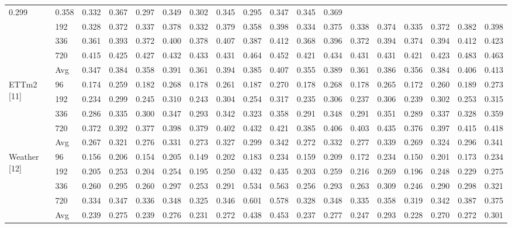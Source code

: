 \documentclass[
  10
]{article}
\begin{document}
{\begin{longtable}[]{@{}llllllllllllllllll@{}}
0.299 & 0.358 & 0.332 & 0.367 & 0.297 & 0.349 & 0.302 & 0.345 & 0.295 &
0.347 & 0.345 & 0.369 \\
& 192 & 0.328 & 0.372 & 0.337 & 0.378 & 0.332 & 0.379 & 0.358 & 0.398 &
0.334 & 0.375 & 0.338 & 0.374 & 0.335 & 0.372 & 0.382 & 0.398 \\
& 336 & 0.361 & 0.393 & 0.372 & 0.400 & 0.378 & 0.407 & 0.387 & 0.412 &
0.368 & 0.396 & 0.372 & 0.394 & 0.374 & 0.394 & 0.412 & 0.423 \\
& 720 & 0.415 & 0.425 & 0.427 & 0.432 & 0.433 & 0.431 & 0.464 & 0.452 &
0.421 & 0.434 & 0.431 & 0.431 & 0.421 & 0.423 & 0.483 & 0.463 \\
& Avg & 0.347 & 0.384 & 0.358 & 0.391 & 0.361 & 0.394 & 0.385 & 0.407 &
0.355 & 0.389 & 0.361 & 0.386 & 0.356 & 0.384 & 0.406 & 0.413 \\
\multirow{5}{*}{ETTm2 {[}11{]}} & 96 & 0.174 & 0.259 & 0.182 & 0.268 &
0.178 & 0.261 & 0.187 & 0.270 & 0.178 & 0.268 & 0.178 & 0.265 & 0.172 &
0.260 & 0.189 & 0.273 \\
& 192 & 0.234 & 0.299 & 0.245 & 0.310 & 0.243 & 0.304 & 0.254 & 0.317 &
0.235 & 0.306 & 0.237 & 0.306 & 0.239 & 0.302 & 0.253 & 0.315 \\
& 336 & 0.286 & 0.335 & 0.300 & 0.347 & 0.293 & 0.342 & 0.323 & 0.358 &
0.291 & 0.348 & 0.291 & 0.351 & 0.289 & 0.337 & 0.328 & 0.359 \\
& 720 & 0.372 & 0.392 & 0.377 & 0.398 & 0.379 & 0.402 & 0.432 & 0.421 &
0.385 & 0.406 & 0.403 & 0.435 & 0.376 & 0.397 & 0.415 & 0.418 \\
& Avg & 0.267 & 0.321 & 0.276 & 0.331 & 0.273 & 0.327 & 0.299 & 0.342 &
0.272 & 0.332 & 0.277 & 0.339 & 0.269 & 0.324 & 0.296 & 0.341 \\
\multirow{5}{*}{Weather {[}12{]}} & 96 & 0.156 & 0.206 & 0.154 & 0.205 &
0.149 & 0.202 & 0.183 & 0.234 & 0.159 & 0.209 & 0.172 & 0.234 & 0.150 &
0.201 & 0.173 & 0.234 \\
& 192 & 0.205 & 0.253 & 0.204 & 0.254 & 0.195 & 0.250 & 0.432 & 0.435 &
0.203 & 0.259 & 0.216 & 0.269 & 0.196 & 0.248 & 0.229 & 0.275 \\
& 336 & 0.260 & 0.295 & 0.260 & 0.297 & 0.253 & 0.291 & 0.534 & 0.563 &
0.256 & 0.293 & 0.263 & 0.309 & 0.246 & 0.290 & 0.298 & 0.321 \\
& 720 & 0.334 & 0.347 & 0.336 & 0.348 & 0.325 & 0.346 & 0.601 & 0.578 &
0.328 & 0.348 & 0.335 & 0.358 & 0.319 & 0.342 & 0.387 & 0.375 \\
& Avg & 0.239 & 0.275 & 0.239 & 0.276 & 0.231 & 0.272 & 0.438 & 0.453 &
0.237 & 0.277 & 0.247 & 0.293 & 0.228 & 0.270 & 0.272 & 0.301 \\

\end{longtable}}
\end{document}
